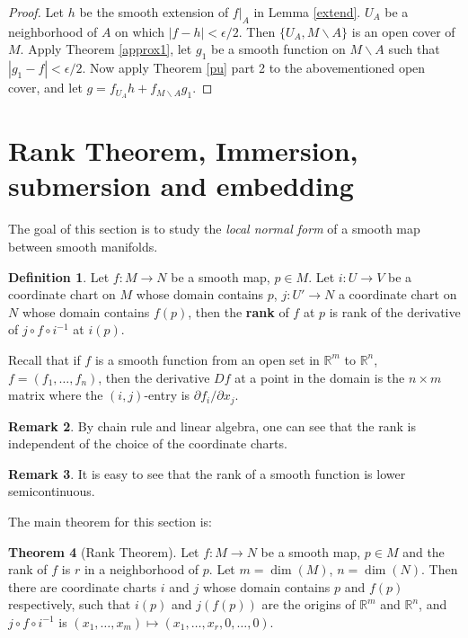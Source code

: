 \documentclass{article}
\theoremstyle{definition}
\newtheorem{thm}{Theorem}[section]
\newtheorem{dfn}[thm]{Definition}
\newtheorem{rmk}[thm]{Remark}
\begin{document}
\begin{proof}
    Let $h$ be the smooth extension of $f|_A$ in Lemma \ref{extend}. $U_A$ be a neighborhood of $A$ on which $|f-h|<\epsilon/2$. Then $\{U_A, M\backslash A\}$ is an open cover of $M$. Apply Theorem \ref{approx1}, let $g_1$ be a smooth function on $M\backslash A$ such that $|g_1-f|<\epsilon/2$.  Now apply Theorem \ref{pu} part 2 to the abovementioned open cover, and let $g=f_{U_A}h+f_{M\backslash A}g_1$.
\end{proof}



\newpage

\section{Rank Theorem, Immersion, submersion and embedding}

The goal of this section is to study the {\em local normal form} of a smooth map between smooth manifolds.\\

\begin{dfn}
Let $f: M\rightarrow N$ be a smooth map, $p\in M$. Let $i: U\rightarrow V$ be a coordinate chart on $M$ whose domain contains $p$, $j: U'\rightarrow N$ a coordinate chart on $N$ whose domain contains $f(p)$, then the {\bf rank} of $f$ at $p$ is rank of the derivative of $j\circ f\circ i^{-1}$ at $i(p)$.
\end{dfn}

Recall that if $f$ is a smooth function from an open set in $\mathbb{R}^m$ to $\mathbb{R}^n$, $f=(f_1, \dots, f_n)$, then the derivative $Df$ at a point in the domain is the $n\times m$ matrix where the $(i, j)$-entry is $\partial f_i/\partial x_j$.

\begin{rmk}
    By chain rule and linear algebra, one can see that the rank is independent of the choice of the coordinate charts. 
\end{rmk}

\begin{rmk}
    It is easy to see that the rank of a smooth function is lower semicontinuous.
\end{rmk}

The main theorem for this section is:

\begin{thm}[Rank Theorem]\label{rank}
    Let $f: M\rightarrow N$ be a smooth map, $p\in M$ and the rank of $f$ is $r$ in a neighborhood of $p$. Let $m=\dim(M)$, $n=\dim(N)$. Then there are coordinate charts $i$ and $j$ whose domain contains $p$ and $f(p)$ respectively, such that $i(p)$ and $j(f(p))$ are the origins of $\mathbb{R}^m$ and $\mathbb{R}^n$, and $j\circ f\circ i^{-1}$ is $(x_1, \dots, x_m)\mapsto (x_1, \dots, x_r, 0, \dots, 0)$.
\end{thm}
\end{document}
